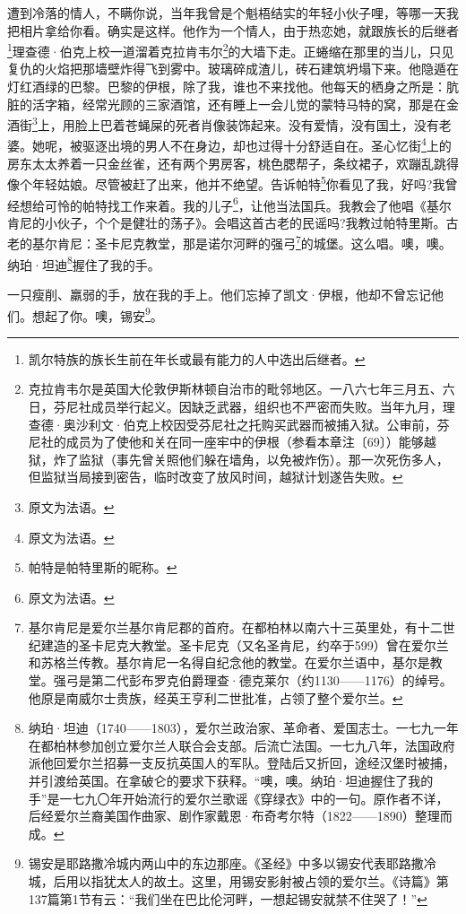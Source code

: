 \par 遭到冷落的情人，不瞒你说，当年我曾是个魁梧结实的年轻小伙子哩，等哪一天我把相片拿给你看。确实是这样。他作为一个情人，由于热恋她，就跟族长的后继者\footnote{凯尔特族的族长生前在年长或最有能力的人中选出后继者。}理查德·伯克上校一道溜着克拉肯韦尔\footnote{克拉肯韦尔是英国大伦敦伊斯林顿自治市的毗邻地区。一八六七年三月五、六日，芬尼社成员举行起义。因缺乏武器，组织也不严密而失败。当年九月，理查德·奥沙利文·伯克上校因受芬尼社之托购买武器而被捕入狱。公审前，芬尼社的成员为了使他和关在同一座牢中的伊根（参看本章注〔69〕）能够越狱，炸了监狱（事先曾关照他们躲在墙角，以免被炸伤）。那一次死伤多人，但监狱当局接到密告，临时改变了放风时间，越狱计划遂告失败。}的大墙下走。正蜷缩在那里的当儿，只见复仇的火焰把那墙壁炸得飞到雾中。玻璃碎成渣儿，砖石建筑坍塌下来。他隐遁在灯红酒绿的巴黎。巴黎的伊根，除了我，谁也不来找他。他每天的栖身之所是：肮脏的活字箱，经常光顾的三家酒馆，还有睡上一会儿觉的蒙特马特的窝，那是在金酒街\footnote{原文为法语。}上，用脸上巴着苍蝇屎的死者肖像装饰起来。没有爱情，没有国土，没有老婆。她呢，被驱逐出境的男人不在身边，却也过得十分舒适自在。圣心忆街\footnote{原文为法语。}上的房东太太养着一只金丝雀，还有两个男房客，桃色腮帮子，条纹裙子，欢蹦乱跳得像个年轻姑娘。尽管被赶了出来，他并不绝望。告诉帕特\footnote{帕特是帕特里斯的昵称。}你看见了我，好吗?我曾经想给可怜的帕特找工作来着。我的儿子\footnote{原文为法语。}，让他当法国兵。我教会了他唱《基尔肯尼的小伙子，个个是健壮的荡子》。会唱这首古老的民谣吗?我教过帕特里斯。古老的基尔肯尼：圣卡尼克教堂，那是诺尔河畔的强弓\footnote{基尔肯尼是爱尔兰基尔肯尼郡的首府。在都柏林以南六十三英里处，有十二世纪建造的圣卡尼克大教堂。圣卡尼克（又名圣肯尼，约卒于599）曾在爱尔兰和苏格兰传教。基尔肯尼一名得自纪念他的教堂。在爱尔兰语中，基尔是教堂。强弓是第二代彭布罗克伯爵理查·德克莱尔（约1130——1176）的绰号。他原是南威尔士贵族，经英王亨利二世批准，占领了整个爱尔兰。}的城堡。这么唱。噢，噢。纳珀·坦迪\footnote{纳珀·坦迪（1740——1803），爱尔兰政治家、革命者、爱国志士。一七九一年在都柏林参加创立爱尔兰人联合会支部。后流亡法国。一七九八年，法国政府派他回爱尔兰招募一支反抗英国人的军队。登陆后又折回，途经汉堡时被捕，并引渡给英国。在拿破仑的要求下获释。“噢，噢。纳珀·坦迪握住了我的手”是一七九〇年开始流行的爱尔兰歌谣《穿绿衣》中的一句。原作者不详，后经爱尔兰裔美国作曲家、剧作家戴恩·布奇考尔特（1822——1890）整理而成。}握住了我的手。
\par 一只瘦削、羸弱的手，放在我的手上。他们忘掉了凯文·伊根，他却不曾忘记他们。想起了你。噢，锡安\footnote{锡安是耶路撒冷城内两山中的东边那座。《圣经》中多以锡安代表耶路撒冷城，后用以指犹太人的故土。这里，用锡安影射被占领的爱尔兰。《诗篇》第137篇第1节有云：“我们坐在巴比伦河畔，一想起锡安就禁不住哭了！”}。
